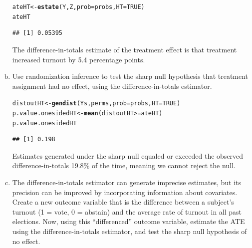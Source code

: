 \documentclass[11pt,notitlepage]{article}\usepackage[]{graphicx}\usepackage[]{color}
\makeatletter
\newcommand{\hlnum}[1]{\textcolor[rgb]{0.686,0.059,0.569}{#1}}%
\newcommand{\hlopt}[1]{\textcolor[rgb]{0,0,0}{#1}}%
\newcommand{\hlstd}[1]{\textcolor[rgb]{0.345,0.345,0.345}{#1}}%
\newcommand{\hlkwb}[1]{\textcolor[rgb]{0.69,0.353,0.396}{#1}}%
\newcommand{\hlkwc}[1]{\textcolor[rgb]{0.333,0.667,0.333}{#1}}%
\newcommand{\hlkwd}[1]{\textcolor[rgb]{0.737,0.353,0.396}{\textbf{#1}}}%
\newenvironment{kframe}{%
 \def\at@end@of@kframe{}%
 \ifinner\ifhmode%
  \def\at@end@of@kframe{\end{minipage}}%
  \begin{minipage}{\columnwidth}%
 \fi\fi%
 \def\FrameCommand##1{\hskip\@totalleftmargin \hskip-\fboxsep
 \colorbox{shadecolor}{##1}\hskip-\fboxsep
     \hskip-\linewidth \hskip-\@totalleftmargin \hskip\columnwidth}%
 \MakeFramed {\advance\hsize-\width
   \@totalleftmargin\z@ \linewidth\hsize
   \@setminipage}}%
 {\par\unskip\endMakeFramed%
 \at@end@of@kframe}
\newenvironment{knitrout}{}{} %
\makeatother
\begin{document}
\begin{enumerate}[a)]
\begin{knitrout}
\color{fgcolor}\begin{kframe}
\begin{alltt}
\hlstd{ateHT} \hlkwb{<-} \hlkwd{estate}\hlstd{(Y,Z,}\hlkwc{prob}\hlstd{=probs,}\hlkwc{HT}\hlstd{=}\hlnum{TRUE}\hlstd{)}
\hlstd{ateHT}
\end{alltt}
\begin{verbatim}
## [1] 0.05395
\end{verbatim}
\end{kframe}
\end{knitrout}

The difference-in-totals estimate of the treatment effect is that treatment increased turnout by 5.4 percentage points.

\item Use randomization inference to test the sharp null hypothesis that treatment assignment had no effect, using the difference-in-totals estimator.  

\begin{knitrout}
\color{fgcolor}\begin{kframe}
\begin{alltt}
\hlstd{distoutHT} \hlkwb{<-} \hlkwd{gendist}\hlstd{(Ys,perms,}\hlkwc{prob}\hlstd{=probs,}\hlkwc{HT}\hlstd{=}\hlnum{TRUE}\hlstd{)}
\hlstd{p.value.onesidedHT} \hlkwb{<-} \hlkwd{mean}\hlstd{(distoutHT} \hlopt{>=} \hlstd{ateHT)}
\hlstd{p.value.onesidedHT}
\end{alltt}
\begin{verbatim}
## [1] 0.198
\end{verbatim}
\end{kframe}
\end{knitrout}

Estimates generated under the sharp null equaled or exceeded the observed difference-in-totals 19.8\% of the time, meaning we cannot reject the null.

\item The difference-in-totals estimator can generate imprecise estimates, but its precision can be improved by incorporating information about covariates. Create a new outcome variable that is the difference between a subject's turnout (1 = vote, 0 = abstain) and the average rate of turnout in all past elections. Now, using this ``differenced'' outcome variable, estimate the ATE using the difference-in-totals estimator, and test the sharp null hypothesis of no effect.


\end{enumerate}
\end{document}
